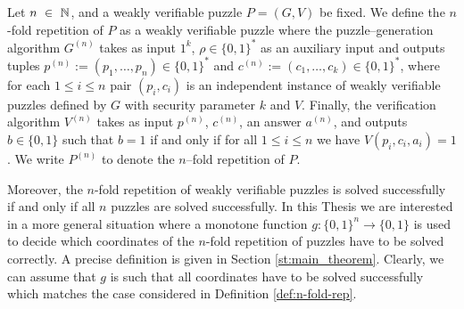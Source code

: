%
\begin{definition}
  \label{def:n-fold-rep}
  Let $n~\in~\mathbb{N}$, and a weakly verifiable puzzle $P = (G,V)$ be fixed.
  We define the $n$-fold repetition of $P$ as a weakly verifiable puzzle where the puzzle--generation algorithm
  $G^{(n)}$ takes as input $1^k$, $\rho \in \{0,1\}^{*}$ as an auxiliary input and outputs tuples $p^{(n)} := (p_1, \dotsc, p_n) \in \{0,1\}^{*}$ and $c^{(n)} := (c_1, \dotsc, c_k) \in \{0,1\}^{*}$,
  where for each $1 \leq i \leq n$ pair $(p_i, c_i)$ is an independent instance of weakly verifiable puzzles defined by $G$ with security parameter $k$ and $V$.
  Finally, the verification algorithm $V^{(n)}$ takes as input $p^{(n)}$, $c^{(n)}$, an answer $a^{(n)}$, and outputs $b \in \{0,1\}$
  such that $b = 1$ if and only if for all $1 \leq i \leq n$ we have $V(p_i, c_i, a_i) = 1$.
  We write $P^{(n)}$ to denote the $n$--fold repetition of $P$.
 \end{definition}
%
Moreover, the $n$-fold repetition of weakly verifiable puzzles is solved successfully if and only if all $n$ puzzles are solved successfully.
In this Thesis we are interested in a more general situation where a monotone function $g: \{0,1\}^{n} \rightarrow \{0,1\}$ is used to decide
which coordinates of the $n$-fold repetition of puzzles have to be solved correctly. A precise definition is given in Section \ref{st:main_theorem}.
Clearly, we can assume that $g$ is such that all coordinates have to be solved successfully which matches the case considered in Definition \ref{def:n-fold-rep}.

